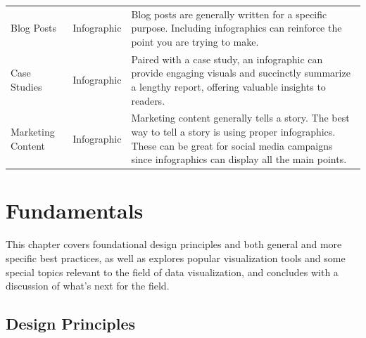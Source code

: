 \documentclass[]{book}
\begin{document}
\begin{longtable}[]{@{}lll@{}}
\begin{minipage}[t]{0.13\columnwidth}
Blog Posts\strut
\end{minipage} & \begin{minipage}[t]{0.18\columnwidth}\raggedright
Infographic\strut
\end{minipage} & \begin{minipage}[t]{0.60\columnwidth}\raggedright
Blog posts are generally written for a specific purpose. Including infographics can reinforce the point you are trying to make.\strut
\end{minipage}\tabularnewline
\begin{minipage}[t]{0.13\columnwidth}\raggedright
Case Studies\strut
\end{minipage} & \begin{minipage}[t]{0.18\columnwidth}\raggedright
Infographic\strut
\end{minipage} & \begin{minipage}[t]{0.60\columnwidth}\raggedright
Paired with a case study, an infographic can provide engaging visuals and succinctly summarize a lengthy report, offering valuable insights to readers.\strut
\end{minipage}\tabularnewline
\begin{minipage}[t]{0.13\columnwidth}\raggedright
Marketing Content\strut
\end{minipage} & \begin{minipage}[t]{0.18\columnwidth}\raggedright
Infographic\strut
\end{minipage} & \begin{minipage}[t]{0.60\columnwidth}\raggedright
Marketing content generally tells a story. The best way to tell a story is using proper infographics. These can be great for social media campaigns since infographics can display all the main points.\strut
\end{minipage}\tabularnewline
\bottomrule
\end{longtable}

\hypertarget{fundamentals}{%
\chapter{Fundamentals}\label{fundamentals}}

This chapter covers foundational design principles and both general and more specific best practices, as well as explores popular visualization tools and some special topics relevant to the field of data visualization, and concludes with a discussion of what's next for the field.

\hypertarget{design-principles}{%
\section{Design Principles}\label{design-principles}}
\end{document}
